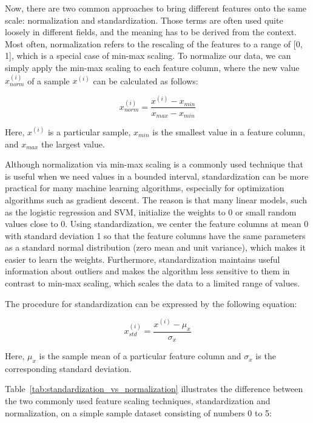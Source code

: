 \documentclass[11pt]{article}
\begin{document}
    Now, there are two common approaches to bring different features onto the same scale: normalization and standardization.
    Those terms are often used quite loosely in different fields, and the meaning has to be derived from the context.
    Most often, normalization refers to the rescaling of the features to a range of [0, 1], which is a special case of min-max scaling.
    To normalize our data, we can simply apply the min-max scaling to each feature column, where the new value $x^(i)_{norm}$ of a sample $x^(i)$ can be calculated as follows:

    \begin{equation} \label{eq:min_max_scaling}
        x^{(i)}_{norm} = \frac{x^{(i)} - x_{min}} {x_{max} - x_{min}}
    \end{equation}

    Here, $x^{(i)}$ is a particular sample, $x_{min}$ is the smallest value in a feature column, and $x_{max}$ the largest value.

    Although normalization via min-max scaling is a commonly used technique that is useful when we need values in a bounded interval, standardization can be more practical for many machine learning algorithms, especially for optimization algorithms such as gradient descent.
    The reason is that many linear models, such as the logistic regression and SVM, initialize the weights to 0 or small random values close to 0.
    Using standardization, we center the feature columns at mean 0 with standard deviation 1 so that the feature columns have the same parameters as a standard normal distribution (zero mean and unit variance), which makes it easier to learn the weights.
    Furthermore, standardization maintains useful information about outliers and makes the algorithm less sensitive to them in contrast to min-max scaling, which scales the data to a limited range of values.

    The procedure for standardization can be expressed by the following equation:

    \begin{equation}
        x^{(i)}_{std} = \frac{x^{(i)} - \mu_x}{\sigma_x}
    \end{equation}

    Here, $\mu_x$ is the sample mean of a particular feature column and $\sigma_x$ is the corresponding standard deviation.

    Table~\ref{tab:standardization_vs_normalization} illustrates the difference between the two commonly used feature scaling techniques, standardization and normalization, on a simple sample dataset consisting of numbers 0 to 5:
\end{document}
